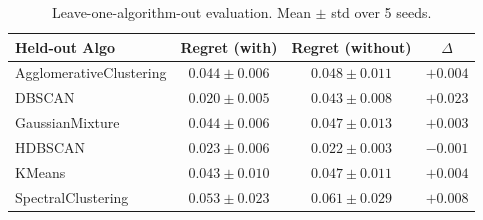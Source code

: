 \begin{table}[t]
\centering
\caption{Leave-one-algorithm-out evaluation. Mean $\pm$ std over 5 seeds.}
\label{tab:leave_algo}
\begin{tabular}{lccc}
\toprule
Held-out Algo & Regret (with) & Regret (without) & $\Delta$ \\
\midrule
AgglomerativeClustering & $0.044 \pm 0.006$ & $0.048 \pm 0.011$ & $+0.004$ \\
DBSCAN & $0.020 \pm 0.005$ & $0.043 \pm 0.008$ & $+0.023$ \\
GaussianMixture & $0.044 \pm 0.006$ & $0.047 \pm 0.013$ & $+0.003$ \\
HDBSCAN & $0.023 \pm 0.006$ & $0.022 \pm 0.003$ & $-0.001$ \\
KMeans & $0.043 \pm 0.010$ & $0.047 \pm 0.011$ & $+0.004$ \\
SpectralClustering & $0.053 \pm 0.023$ & $0.061 \pm 0.029$ & $+0.008$ \\
\bottomrule
\end{tabular}
\end{table}